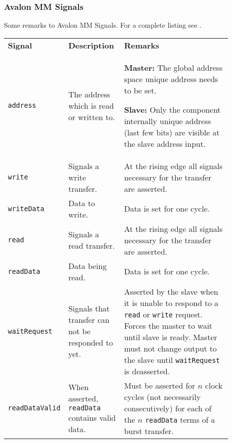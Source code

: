 		\subsubsection{Avalon MM Signals }
			Some remarks to Avalon MM Signals. For a complete listing see .
			\begin{longtable}{|p{0.15\linewidth}||p{0.25\linewidth}|p{0.5\linewidth}|}					
				\hline
				\textbf{Signal}
					& \textbf{Description}
					& \textbf{Remarks}\\
				\hhline{|=#=|=|}
				\texttt{address}
					& The address which is read or written to. 
					&   \textbf{Master:} The global address space unique address needs to be set.
					
					  	\textbf{Slave:} Only the component internally unique address (last few bits) are visible at the slave address input.\\
				\hline
				\texttt{write}
					& Signals a write transfer.
					& At the rising edge all signals necessary for the transfer are asserted.\\
				\hline
				\texttt{writeData}
					& Data to write.
					& Data is set for one cycle.\\
				\hline
				\texttt{read}
					& Signals a read transfer.
					& At the rising edge all signals necessary for the transfer are asserted.\\
				\hline
				\texttt{readData}
					& Data being read.
					& Data is set for one cycle.\\
				\hline
				\texttt{waitRequest}
					& Signals that transfer can not be responded to yet.
					& Asserted by the slave when it is unable to respond to a \texttt{read} or \texttt{write} request. Forces the master to wait until slave is ready. Master must not change output to the slave until \texttt{waitRequest} is deasserted.\\
				\hline
				\texttt{readDataValid}
					& When asserted, \texttt{readData} contains valid data.
					& Must be asserted for $n$ clock cycles (not necessarily consecutively) for each of the $n$ \texttt{readData} terms of a burst transfer.\\
				\hline
			\end{longtable}
			
